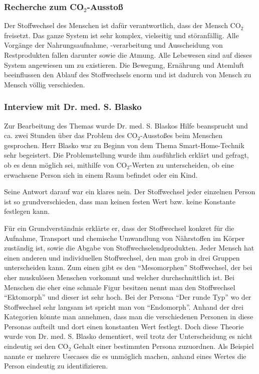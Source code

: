 \subsubsection{Recherche zum CO$_2$-Ausstoß}
Der Stoffwechsel des Menschen ist dafür verantwortlich, dass der Mensch CO$_2$ freisetzt. Das ganze System ist sehr komplex, vielseitig und störanfällig. Alle Vorgänge der Nahrungsaufnahme, -verarbeitung und Ausscheidung von Restprodukten fallen darunter sowie die Atmung. Alle Lebewesen sind auf dieses System angewiesen um zu existieren. Die Bewegung, Ernährung und Atemluft beeinflussen den Ablauf des Stoffwechsels enorm und ist dadurch von Mensch zu Mensch völlig verschieden.

\subsubsection{Interview mit Dr. med. S. Blasko}
Zur Bearbeitung des Themas wurde Dr. med. S. Blaskos Hilfe beansprucht und ca. zwei Stunden über das Problem des CO$_2$-Ausstoßes beim Menschen gesprochen. Herr Blasko war zu Beginn von dem Thema Smart-Home-Technik sehr begeistert. Die Problemstellung wurde ihm ausführlich erklärt und gefragt, ob es denn möglich sei, mithilfe von CO$_2$-Werten zu unterscheiden, ob eine erwachsene Person sich in einem Raum befindet oder ein Kind.

Seine Antwort darauf war ein klares nein. Der Stoffwechsel jeder einzelnen Person ist so grundverschieden, dass man keinen festen Wert bzw. keine Konstante festlegen kann. 

Für ein Grundverständnis erklärte er, dass der Stoffwechsel konkret für
die Aufnahme, Transport und chemische Umwandlung von Nährstoffen im Körper zuständig ist, sowie die Abgabe von Stoffwechselendprodukten. Jeder Mensch hat einen anderen und individuellen Stoffwechsel, den man grob in drei Gruppen unterscheiden kann. Zum einen gibt es den "`Mesomorphen"' Stoffwechsel, der bei eher muskulösen Menschen vorkommt und welcher durchschnittlich ist. Bei Menschen die eher eine schmale Figur besitzen nennt man den Stoffwechsel "`Ektomorph"' und dieser ist sehr hoch. Bei der Persona "`Der runde Typ"' wo der Stoffwechsel sehr langsam ist spricht man von "`Endomorph"'. Anhand der drei Kategorien könnte man annehmen, dass man die verschiedenen Personen in diese Personas aufteilt und dort einen konstanten Wert festlegt. Doch diese Theorie wurde von Dr. med. S. Blasko dementiert, weil trotz der Unterscheidung es nicht eindeutig sei den CO$_2$ Gehalt einer bestimmten Persona zuzuordnen. Als Beispiel nannte er mehrere Usecases die es unmöglich machen, anhand eines Wertes die Person eindeutig zu identifizieren.

